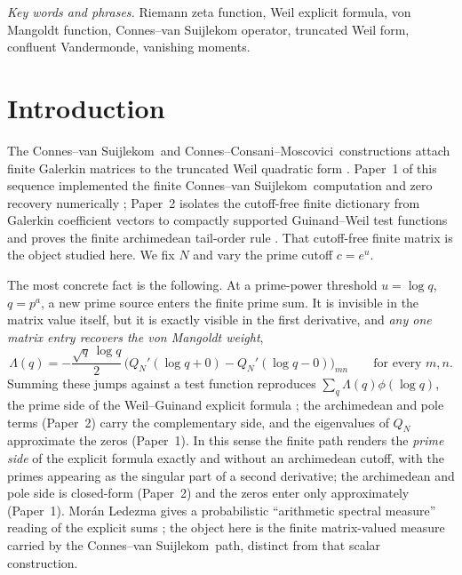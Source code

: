\documentclass[11pt]{article}
\theoremstyle{plain}
\theoremstyle{definition}
\theoremstyle{remark}
\newcommand{\cvs}{Connes--van Suijlekom}
\newcommand{\ccm}{Connes--Consani--Moscovici}
\newcommand{\Lam}{\Lambda}
\begin{document}
\noindent\textit{Key words and phrases.} Riemann zeta function, Weil explicit
formula, von Mangoldt function, Connes--van Suijlekom operator, truncated Weil
form, confluent Vandermonde, vanishing moments.

\section{Introduction}

The \cvs\ and \ccm\ constructions attach finite Galerkin matrices to the
truncated Weil quadratic form
\cite{ConnesvanSuijlekom2025,ConnesConsaniMoscovici2025}. Paper~1 of this
sequence implemented the finite \cvs\ computation and zero recovery numerically
\cite{Groskin2026Paper1}; Paper~2 isolates the cutoff-free finite dictionary
from Galerkin coefficient vectors to compactly supported Guinand--Weil test
functions and proves the finite archimedean tail-order rule
\cite{Groskin2026FiniteDictionary}. That cutoff-free finite matrix is the object
studied here. We fix $N$ and vary the prime cutoff $c=e^{u}$.

The most concrete fact is the following. At a prime-power threshold $u=\log q$,
$q=p^{a}$, a new prime source enters the finite prime sum. It is invisible in
the matrix value itself, but it is exactly visible in the first derivative, and
\emph{any one matrix entry recovers the von Mangoldt weight},
\[
        \Lam(q)=-\frac{\sqrt q\,\log q}{2}\,
        \bigl(Q_N'(\log q+0)-Q_N'(\log q-0)\bigr)_{mn}
        \qquad\text{for every }m,n.
\]
Summing these jumps against a test function reproduces $\sum_{q}\Lam(q)\phi(\log
q)$, the prime side of the Weil--Guinand explicit formula
\cite{Weil1952,IwaniecKowalski2004}; the archimedean and pole terms
(Paper~2) carry the complementary side, and the eigenvalues of $Q_N$
approximate the zeros (Paper~1). In this sense the finite path renders the
\emph{prime side} of the explicit formula exactly and without an archimedean
cutoff, with the primes appearing as the singular part of a second derivative;
the archimedean and pole side is closed-form (Paper~2) and the zeros enter only
approximately (Paper~1). Morán Ledezma gives a
probabilistic ``arithmetic spectral measure'' reading of the explicit sums
\cite{MoranLedezma2023}; the object here is the finite matrix-valued measure
carried by the \cvs\ path, distinct from that scalar construction.
\end{document}
